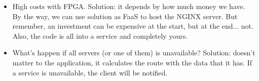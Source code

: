 \documentclass[a4paper]{article}
\begin{document}
\begin{itemize}
\begin{itemize}
            \item High costs with FPGA. Solution: it depends by how much money we have. By the way, we can use solution as FaaS to host the NGINX server. But remember, an investment can be expensive at the start, but at the end... not. Also, the code is all into a service and completely yours.
            
            \item What's happen if all servers (or one of them) is unavailable? Solution: doesn't matter to the application, it calculates the route with the data that it has. If a service is unavailable, the client will be notified.
        \end{itemize}
    \end{itemize}
\end{document}
